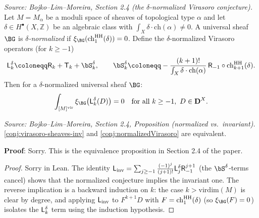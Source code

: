 \begin{conjecture}[VirasoroConjectureNormalized]
  \label{conj:normalizedVirasoro}
  \textit{Source: Bojko--Lim--Moreira, Section 2.4 (the \(\delta\)-normalized
  Virasoro conjecture).}
  Let \(M = M_\alpha\) be a moduli space of sheaves of topological type \(\alpha\) and
  let \(\delta \in H^\bullet(X, \mathbb{Z})\) be an algebraic class with
  \(\int_X \delta \cdot \mathrm{ch}(\alpha) \neq 0\). A universal sheaf \(\BG\) is
  \emph{\(\delta\)-normalized} if \(\xi_\BG(\chh_1(\delta)) = 0\). Define the
  \(\delta\)-normalized Virasoro operators (for \(k \geq -1\))
  \[\bL_k^\delta \coloneqq \bR_k + \bT_k + \bS_k^\delta, \qquad
    \bS_k^\delta \coloneqq -\frac{(k+1)!}{\int_X \delta \cdot \mathrm{ch}(\alpha)}\,
    \bR_{-1} \circ \chh_{k+1}(\delta).\]
  Then for a \(\delta\)-normalized universal sheaf \(\BG\):
  \[\int_{[M]^\vir} \xi_\BG\bigl(\bL_k^\delta(D)\bigr) = 0
    \quad \text{for all } k \geq -1,\ D \in \BD^X.\]
\end{conjecture}


\begin{proposition}[NormalizedEquivalentToInvariant]
  \label{prop:normalizedvsinv}
  \textit{Source: Bojko--Lim--Moreira, Section 2.4, Proposition (normalized vs.\
  invariant).}
  \cref{conj:virasoro-sheaves-inv} and \cref{conj:normalizedVirasoro} are equivalent.

  \textbf{Proof}: Sorry. This is the equivalence proposition in Section 2.4 of the paper.
\end{proposition}

\begin{proof}
  Sorry in Lean. The identity
  \(\mathsf{L}_{\mathrm{inv}} = \sum_{j \geq -1} \tfrac{(-1)^j}{(j+1)!} \mathsf{L}_j^\delta \mathsf{R}_{-1}^{j+1}\)
  (the \(\bS^\delta\)-terms cancel) shows that the normalized conjecture implies the
  invariant one. The reverse implication is a backward induction on \(k\): the case
  \(k > \mathrm{virdim}(M)\) is clear by degree, and applying \(\mathsf{L}_{\mathrm{inv}}\) to
  \(F^{k+1}D\) with \(F = \mathrm{ch}^{\mathrm{HH}}_1(\delta)\) (so \(\xi_\BG(F) = 0\)) isolates the
  \(\mathsf{L}_k^\delta\) term using the induction hypothesis.
\end{proof}

